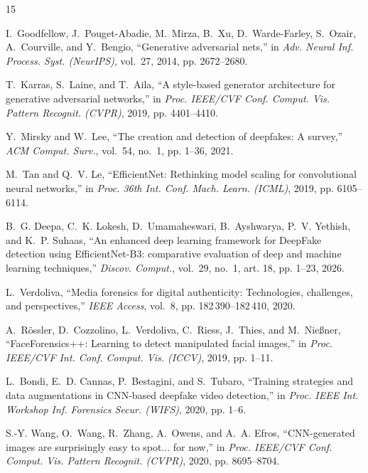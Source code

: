 \documentclass[conference]{IEEEtran}
\begin{document}
\begin{thebibliography}{15}

I.~Goodfellow, J.~Pouget-Abadie, M.~Mirza, B.~Xu, D.~Warde-Farley, S.~Ozair, A.~Courville, and Y.~Bengio, ``Generative adversarial nets,'' in \emph{Adv. Neural Inf. Process. Syst. (NeurIPS)}, vol.~27, 2014, pp. 2672--2680.

T.~Karras, S.~Laine, and T.~Aila, ``A style-based generator architecture for generative adversarial networks,'' in \emph{Proc. IEEE/CVF Conf. Comput. Vis. Pattern Recognit. (CVPR)}, 2019, pp. 4401--4410.

Y.~Mirsky and W.~Lee, ``The creation and detection of deepfakes: A survey,'' \emph{ACM Comput. Surv.}, vol.~54, no.~1, pp. 1--36, 2021.

M.~Tan and Q.~V. Le, ``EfficientNet: Rethinking model scaling for convolutional neural networks,'' in \emph{Proc. 36th Int. Conf. Mach. Learn. (ICML)}, 2019, pp. 6105--6114.

B.~G. Deepa, C.~K. Lokesh, D.~Umamaheswari, B.~Ayshwarya, P.~V. Yethish, and K.~P. Suhaas, ``An enhanced deep learning framework for DeepFake detection using EfficientNet-B3: comparative evaluation of deep and machine learning techniques,'' \emph{Discov. Comput.}, vol.~29, no.~1, art. 18, pp. 1--23, 2026.

L.~Verdoliva, ``Media forensics for digital authenticity: Technologies, challenges, and perspectives,'' \emph{IEEE Access}, vol.~8, pp. 182\,390--182\,410, 2020.

A.~R{\"o}ssler, D.~Cozzolino, L.~Verdoliva, C.~Riess, J.~Thies, and M.~Nie{\ss}ner, ``FaceForensics++: Learning to detect manipulated facial images,'' in \emph{Proc. IEEE/CVF Int. Conf. Comput. Vis. (ICCV)}, 2019, pp. 1--11.

L.~Bondi, E.~D. Cannas, P.~Bestagini, and S.~Tubaro, ``Training strategies and data augmentations in CNN-based deepfake video detection,'' in \emph{Proc. IEEE Int. Workshop Inf. Forensics Secur. (WIFS)}, 2020, pp. 1--6.

S.-Y. Wang, O.~Wang, R.~Zhang, A.~Owens, and A.~A. Efros, ``CNN-generated images are surprisingly easy to spot... for now,'' in \emph{Proc. IEEE/CVF Conf. Comput. Vis. Pattern Recognit. (CVPR)}, 2020, pp. 8695--8704.


\end{thebibliography}
\end{document}
